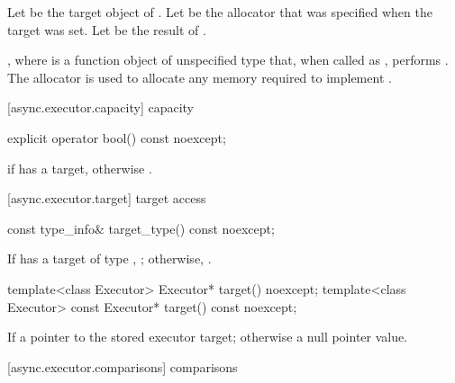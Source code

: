 \begin{itemdescr}
\pnum
Let  be the target object of . Let  be the allocator that was specified when the target was set. Let  be the result of .

\pnum
\effects {}, where  is a function object of unspecified type that, when called as , performs . The allocator  is used to allocate any memory required to implement .
\end{itemdescr}



[async.executor.capacity]{ capacity}

%
\begin{itemdecl}
explicit operator bool() const noexcept;
\end{itemdecl}

\begin{itemdescr}
\pnum
\returns {} if  has a target, otherwise .
\end{itemdescr}



[async.executor.target]{ target access}

%
\begin{itemdecl}
const type_info& target_type() const noexcept;
\end{itemdecl}

\begin{itemdescr}
\pnum
\returns If  has a target of type , ; otherwise, .
\end{itemdescr}

%
\begin{itemdecl}
template<class Executor> Executor* target() noexcept;
template<class Executor> const Executor* target() const noexcept;
\end{itemdecl}

\begin{itemdescr}
\pnum
\returns If  a pointer to the stored executor target; otherwise a null pointer value.
\end{itemdescr}



[async.executor.comparisons]{ comparisons}

